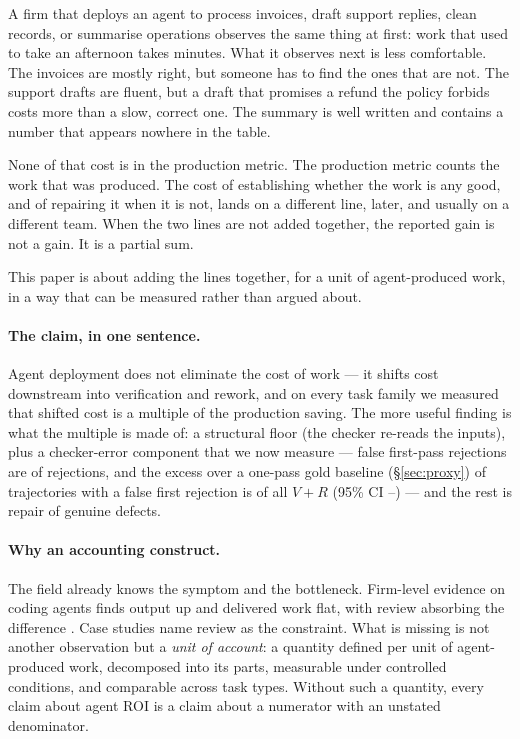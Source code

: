 \documentclass[11pt]{article}
\newcommand{\VV}{\ensuremath{V}}
\newcommand{\RV}{\ensuremath{R}}
\begin{document}
A firm that deploys an agent to process invoices, draft support replies, clean records, or
summarise operations observes the same thing at first: work that used to take an afternoon
takes minutes. What it observes next is less comfortable. The invoices are mostly right, but
someone has to find the ones that are not. The support drafts are fluent, but a draft that
promises a refund the policy forbids costs more than a slow, correct one. The summary is
well written and contains a number that appears nowhere in the table.

None of that cost is in the production metric. The production metric counts the work that was
produced. The cost of establishing whether the work is any good, and of repairing it when it is
not, lands on a different line, later, and usually on a different team. When the two lines are
not added together, the reported gain is not a gain. It is a partial sum.

This paper is about adding the lines together, for a unit of agent-produced work, in a way that
can be measured rather than argued about.

\paragraph{The claim, in one sentence.}
Agent deployment does not eliminate the cost of work --- it shifts cost downstream into
verification and rework, and on every task family we measured that shifted cost is a multiple of
the production saving. The more useful finding is what the multiple is made of: a structural floor
(the checker re-reads the inputs), plus a checker-error component that we now measure --- false
first-pass rejections are \VDdetFalseRej{} of rejections, and the excess over a one-pass gold
baseline (\S\ref{sec:proxy}) of trajectories with a false first rejection is \VDchkShare{} of all
$\VV+\RV$ (95\% CI \VDchkShareLo--\VDchkShareHi) --- and the rest is repair of genuine defects.

\paragraph{Why an accounting construct.}
The field already knows the symptom and the bottleneck. Firm-level evidence on coding agents
finds output up and delivered work flat, with review absorbing the difference
\citep{chen2026}. Case studies name review as the constraint. What is missing is not another
observation but a \emph{unit of account}: a quantity defined per unit of agent-produced work,
decomposed into its parts, measurable under controlled conditions, and comparable across task
types. Without such a quantity, every claim about agent ROI is a claim about a numerator with an
unstated denominator.
\end{document}
